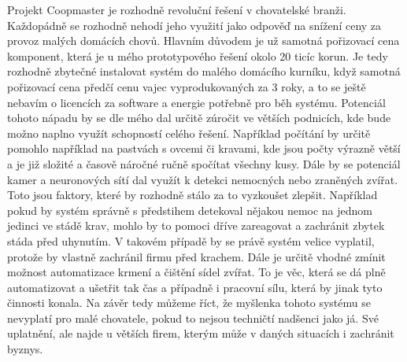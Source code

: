 Projekt Coopmaster je rozhodně revoluční řešení v chovatelské branži.
Každopádně se rozhodně nehodí jeho využití jako odpověď na snížení ceny za provoz malých domácích chovů.
Hlavním důvodem je už samotná pořizovací cena komponent, která je u mého prototypového řešení okolo 20 ticíc korun.
Je tedy rozhodně zbytečné instalovat systém do malého domácího kurníku, když samotná pořizovací cena předčí cenu vajec vyprodukovaných za 3 roky, a to se ještě nebavím o licencích za software a energie potřebně pro běh systému.\newline
Potenciál tohoto nápadu by se dle mého dal určitě zúročit ve větších podnicích, kde bude možno naplno využít schopností celého řešení.
Například počítání by určitě pomohlo například na pastvách s ovcemi či kravami, kde jsou počty výrazně větší a je již složité a časově náročné ručně spočítat všechny kusy.
Dále by se potenciál kamer a neuronových sítí dal využít k detekci nemocných nebo zraněných zvířat.
Toto jsou faktory, které by rozhodně stálo za to vyzkoušet zlepšit.
Například pokud by systém správně s předstihem detekoval nějakou nemoc na jednom jedinci ve stádě krav, mohlo by to pomoci dříve zareagovat a zachránit zbytek stáda před uhynutím.
V takovém případě by se právě systém velice vyplatil, protože by vlastně zachránil firmu před krachem.\newline
Dále je určitě vhodné zmínit možnost automatizace krmení a čištění sídel zvířat.
To je věc, která se dá plně automatizovat a ušetřit tak čas a případně i pracovní sílu, která by jinak tyto činnosti konala.\newline
Na závěr tedy můžeme říct, že myšlenka tohoto systému se nevyplatí pro malé chovatele, pokud to nejsou techničtí nadšenci jako já.
Své uplatnění, ale najde u větších firem, kterým může v daných situacích i zachránit byznys.





